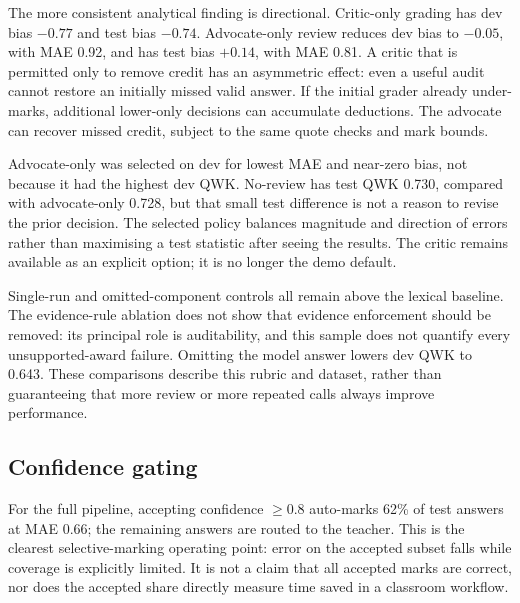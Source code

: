 \begin{table}[htbp]
\centering
\caption{Review and component ablations. The full arm and advocate-only arm are different runs from their headline counterparts in Table~\ref{tab:agreement}.}
\label{tab:ablation}
\end{table}

The more consistent analytical finding is directional. Critic-only grading has dev bias $-0.77$ and test bias $-0.74$. Advocate-only review reduces dev bias to $-0.05$, with MAE 0.92, and has test bias $+0.14$, with MAE 0.81. A critic that is permitted only to remove credit has an asymmetric effect: even a useful audit cannot restore an initially missed valid answer. If the initial grader already under-marks, additional lower-only decisions can accumulate deductions. The advocate can recover missed credit, subject to the same quote checks and mark bounds.

Advocate-only was selected on dev for lowest MAE and near-zero bias, not because it had the highest dev QWK. No-review has test QWK 0.730, compared with advocate-only 0.728, but that small test difference is not a reason to revise the prior decision. The selected policy balances magnitude and direction of errors rather than maximising a test statistic after seeing the results. The critic remains available as an explicit option; it is no longer the demo default.

Single-run and omitted-component controls all remain above the lexical baseline. The evidence-rule ablation does not show that evidence enforcement should be removed: its principal role is auditability, and this sample does not quantify every unsupported-award failure. Omitting the model answer lowers dev QWK to 0.643. These comparisons describe this rubric and dataset, rather than guaranteeing that more review or more repeated calls always improve performance.

\subsection{Confidence gating}
For the full pipeline, accepting confidence $\geq 0.8$ auto-marks 62\% of test answers at MAE 0.66; the remaining answers are routed to the teacher. This is the clearest selective-marking operating point: error on the accepted subset falls while coverage is explicitly limited. It is not a claim that all accepted marks are correct, nor does the accepted share directly measure time saved in a classroom workflow.

